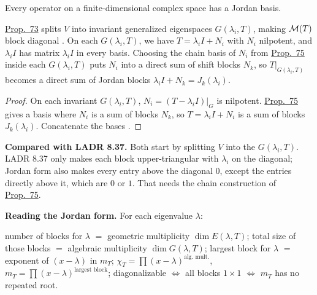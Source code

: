 \documentclass[10pt]{scrartcl}
\begin{document}
\begin{theorem*}\hypertarget{prop-76}{}\label{prop-76}
  Every operator on a finite-dimensional complex space has a Jordan basis.
\end{theorem*}
\begin{ideabox}
\hyperref[prop-73]{Prop.~73} splits $V$ into invariant generalized eigenspaces $G(\lambda_i,T)$, making $\mathcal M(T)$ block diagonal . On each $G(\lambda_i,T)$, we have $T=\lambda_iI+N_i$ with $N_i$ nilpotent, and $\lambda_iI$ has matrix $\lambda_iI$ in every basis. Choosing the chain basis of $N_i$ from \hyperref[prop-75]{Prop.~75} inside each $G(\lambda_i,T)$ puts $N_i$ into a direct sum of shift blocks $N_k$, so $T|_{G(\lambda_i,T)}$ becomes a direct sum of Jordan blocks $\lambda_iI+N_k=J_k(\lambda_i)$.
\end{ideabox}
\begin{proof}
  On each invariant $G(\lambda_i,T)$, $N_i=(T-\lambda_iI)|_{G}$ is nilpotent. \hyperref[prop-75]{Prop.~75} gives a basis where $N_i$ is a sum of blocks $N_k$, so $T=\lambda_iI+N_i$ is a sum of blocks $J_k(\lambda_i)$. Concatenate the bases .
\end{proof}
\textbf{Compared with LADR 8.37.} Both start by splitting $V$ into the $G(\lambda_i,T)$. LADR 8.37 only makes each block upper-triangular with $\lambda_i$ on the diagonal; Jordan form also makes every entry above the diagonal $0$, except the entries directly above it, which are $0$ or $1$. That needs the chain construction of \hyperref[prop-75]{Prop.~75}.

\begin{mdframed}[style=mdbluebox]
\textbf{Reading the Jordan form.} For each eigenvalue $\lambda$:
\begin{itemize}
  \ii number of blocks for $\lambda$ $=$ geometric multiplicity $\dim E(\lambda,T)$;
  \ii total size of those blocks $=$ algebraic multiplicity $\dim G(\lambda,T)$;
  \ii largest block for $\lambda$ $=$ exponent of $(x-\lambda)$ in $m_T$;
  \ii $\chi_T=\prod(x-\lambda)^{\text{alg.\ mult.}}$, $m_T=\prod(x-\lambda)^{\text{largest block}}$;
  \ii diagonalizable $\iff$ all blocks $1\times1$ $\iff$ $m_T$ has no repeated root.
\end{itemize}
\end{mdframed}
\end{document}
